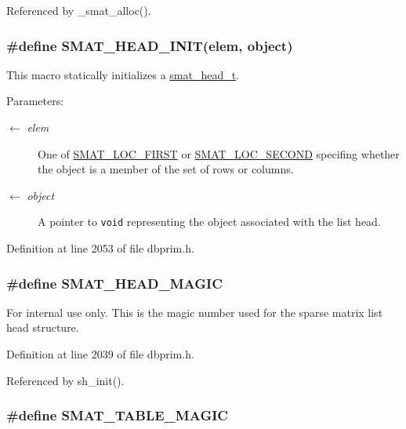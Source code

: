 Referenced by \_\-smat\_\-alloc().\hypertarget{group__dbprim__smat_ga42}{
\subsubsection[SMAT\_\-HEAD\_\-INIT]{\setlength{\rightskip}{0pt plus 5cm}\#define SMAT\_\-HEAD\_\-INIT(elem, object)}}
\label{group__dbprim__smat_ga42}


This macro statically initializes a \hyperlink{group__dbprim__smat_ga1}{smat\_\-head\_\-t}.

\begin{Desc}
\item[Parameters:]
\begin{description}
\item[\mbox{$\leftarrow$} {\em elem}]One of \hyperlink{group__dbprim__smat_gga70a137}{SMAT\_\-LOC\_\-FIRST} or \hyperlink{group__dbprim__smat_gga70a138}{SMAT\_\-LOC\_\-SECOND} specifing whether the object is a member of the set of rows or columns. \item[\mbox{$\leftarrow$} {\em object}]A pointer to {\tt void} representing the object associated with the list head.\end{description}
\end{Desc}


Definition at line 2053 of file dbprim.h.\hypertarget{group__dbprim__smat_ga41}{
\subsubsection[SMAT\_\-HEAD\_\-MAGIC]{\setlength{\rightskip}{0pt plus 5cm}\#define SMAT\_\-HEAD\_\-MAGIC}}
\label{group__dbprim__smat_ga41}


\begin{Desc}
\item[For internal use only.]
This is the magic number used for the sparse matrix list head structure.\end{Desc}


Definition at line 2039 of file dbprim.h.

Referenced by sh\_\-init().\hypertarget{group__dbprim__smat_ga33}{
\subsubsection[SMAT\_\-TABLE\_\-MAGIC]{\setlength{\rightskip}{0pt plus 5cm}\#define SMAT\_\-TABLE\_\-MAGIC}}
\label{group__dbprim__smat_ga33}


